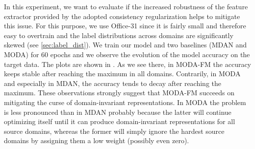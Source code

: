 In this experiment, we want to evaluate if the increased robustness of the feature extractor provided by the adopted consistency regularization helps to mitigate this issue. For this purpose, we use Office-31 since it is fairly small and therefore easy to overtrain and the label distributions across domains are significantly skewed (see \ref{sec:label_dist}). We train our model and two baselines (MDAN and MODA) for 60 epochs and we observe the evolution of the model accuracy on the target data. The plots are shown in . As we see there, in MODA-FM the accuracy keeps stable after reaching the maximum in all domains. Contrarily, in MODA and especially in MDAN, the accuracy tends to decay after reaching the maximum. These observations strongly suggest that MODA-FM succeeds on mitigating the curse of domain-invariant representations. In MODA the problem is less pronounced than in MDAN probably because the latter will continue optimizing itself until it can produce domain-invariant representations for all source domains, whereas the former will simply ignore the hardest source domains by assigning them a low weight (possibly even zero).

